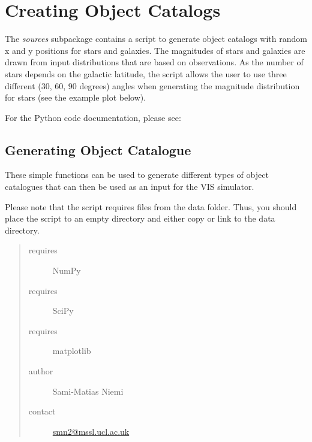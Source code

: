 \documentclass[a4paper,12pt,english]{sphinxmanual}
\begin{document}
\chapter{Creating Object Catalogs}
\label{index:creating-object-catalogs}
The \emph{sources} subpackage contains a script to generate object catalogs with random x and y positions for
stars and galaxies. The magnitudes of stars and galaxies are drawn from input distributions that are
based on observations. As the number of stars depends on the galactic latitude, the script allows
the user to use three different (30, 60, 90 degrees) angles when generating the magnitude distribution for stars
(see the example plot below).

For the Python code documentation, please see:
\label{sources:module-sources.createObjectCatalogue}

\section{Generating Object Catalogue}
\label{sources::doc}\label{sources:generating-object-catalogue}
These simple functions can be used to generate different types of object catalogues that can then be used
as an input for the VIS simulator.

Please note that the script requires files from the data folder. Thus, you should
place the script to an empty directory and either copy or link to the data directory.
\begin{quote}\begin{description}
\item[{requires}] \leavevmode
NumPy

\item[{requires}] \leavevmode
SciPy

\item[{requires}] \leavevmode
matplotlib

\item[{author}] \leavevmode
Sami-Matias Niemi

\item[{contact}] \leavevmode
\href{mailto:smn2@mssl.ucl.ac.uk}{smn2@mssl.ucl.ac.uk}

\end{description}\end{quote}
\end{document}

